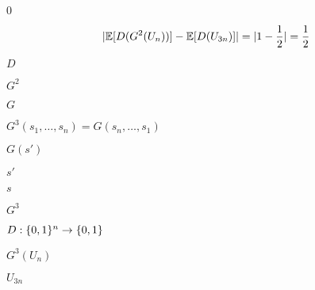 \documentclass[10pt]{book}
\begin{document}
\begin{mdSnippets}
\begin{mdInlineSnippet}%
$0$\end{mdInlineSnippet}%
\begin{mdDisplaySnippet}[7f29b4c673fa23621763bc7b320751c7]%
\[%
|\E[D(G^2(U_n))] - \E[D(U_{3n})] | = |1 - \frac{1}{2}| = \frac{1}{2}
\]%
\end{mdDisplaySnippet}%
\begin{mdInlineSnippet}[f623e75af30e62bbd73d6df5b50bb7b5]%
$D$\end{mdInlineSnippet}%
\begin{mdInlineSnippet}[c6c801b451c5120d54e7f6e66b38b71a]%
$G^2$\end{mdInlineSnippet}%
\begin{mdInlineSnippet}[dfcf28d0734569a6a693bc8194de62bf]%
$G$\end{mdInlineSnippet}%
\begin{mdInlineSnippet}[3db8dd4d59d9485b058cf6452d6ec575]%
$G^3(s_1,\ldots,s_n)=G(s_n,\ldots,s_1)$\end{mdInlineSnippet}%
\begin{mdInlineSnippet}%
$G(s')$\end{mdInlineSnippet}%
\begin{mdInlineSnippet}[085c9f0df11642cf704f40ffdf753055]%
$s'$\end{mdInlineSnippet}%
\begin{mdInlineSnippet}[03c7c0ace395d80182db07ae2c30f034]%
$s$\end{mdInlineSnippet}%
\begin{mdInlineSnippet}%
$G^3$\end{mdInlineSnippet}%
\begin{mdInlineSnippet}%
$D: \{0,1\}^{n} \to \{0,1\}$\end{mdInlineSnippet}%
\begin{mdInlineSnippet}[5a0863e38f0e40856fa892f3d84f0545]%
$G^3(U_n)$\end{mdInlineSnippet}%
\begin{mdInlineSnippet}[f0a24fb1c0ccae60c023621d1a1150f0]%
$U_{3n}$\end{mdInlineSnippet}%

\end{mdSnippets}
\end{document}
